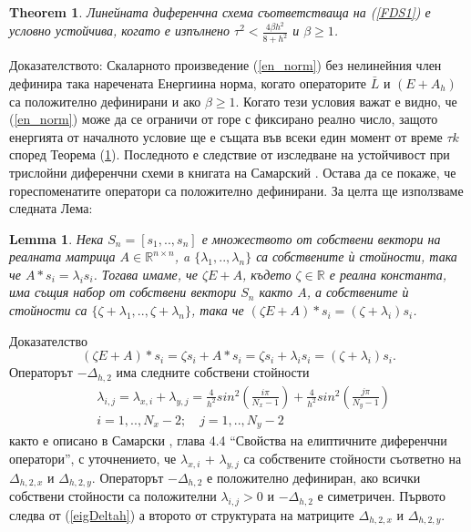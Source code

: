 \documentclass{article}
\newcommand{\be}{\begin{equation}}
\newcommand{\ee}{\end{equation}}
\newcommand{\rf}[1]{(\ref{#1})}
\newcommand{\RR}{\mathbb{R}}
\newtheorem{thm}{Theorem}
\newtheorem{lm}{Lemma}
\begin{document}
\begin{thm}\label{th1}
Линейната диференчна схема съответстваща на \rf{FDS1} е условно устойчива, когато е изпълнено
$\tau^2 < \frac{4 \beta h^2}{8 + h^2}$ и $\beta \ge 1$.
\end{thm}
Доказателството:
Скаларното произведение \rf{en_norm} без нелинейния член дефинира така наречената Енергиина норма, когато операторите $\bar{L}$ и $(E + A_h)$ са положително дефинирани и ако $\beta \ge 1$. Когато тези условия важат е видно, че \rf{en_norm} може да се ограничи от горе с фиксирано реално число, защото енергията от началното условие ще е същата във всеки един момент от време $\tau k$ според Теорема \rf{th1}. Последното е следствие от изследване на устойчивост при трислойни диференчни схеми в книгата на Самарский \cite{samarski}. Остава да се покаже, че гореспоменатите оператори са положително дефинирани. За целта ще използваме следната Лема:

\begin{lm}\label{lemma1}
Нека $S_n=[s_1,..,s_n]$ е множеството от собствени вектори на реалната матрица $A \in \RR^{n\times n}$,
a $\{\lambda_1,..,\lambda_n\}$ са собствените ѝ стойности, така че $A *s_i = \lambda_i s_i$. Тогава имаме, че $\zeta E + A$, където $\zeta \in \RR$ е реална константа, има същия набор от собствени вектори $S_n$ както $A$, а собствените ѝ стойности са $\{\zeta + \lambda_1,..,\zeta + \lambda_n\}$, така че $(\zeta E + A) * s_i = (\zeta+ \lambda_i) s_i$.
\end{lm}
Доказателство
\be
(\zeta E + A) * s_i = \zeta s_i + A * s_i = \zeta s_i + \lambda_i s_i = (\zeta + \lambda_i) s_i.
\ee
Операторът $-\Delta_{h,2}$ има следните собствени стойности
\begin{align}\label{eigDeltah}
&\lambda_{i,j} = \lambda_{x, i} + \lambda_{y,j} = \frac{4}{h^2}sin^2(\frac{i \pi}{N_x-1}) +  \frac{4}{h^2}sin^2(\frac{j \pi}{N_y-1}) \\
&i = 1,..,N_x-2; \quad j = 1, .. , N_y-2 \nonumber
\end{align}
както е описано в Самарски \cite{samarski}, глава 4.4 ``Свойства на елиптичните диференчни оператори'', с уточнението, че $\lambda_{x, i}$ + $\lambda_{y,j}$ са собствените стойности съответно на $\Delta_{h,2,x}$ и $\Delta_{h,2,y}$. Операторът $-\Delta_{h,2}$ е положително дефиниран, ако всички собствени стойности са положителни $\lambda_{i,j}>0$ и $-\Delta_{h,2}$ е симетричен. Първото следва от \rf{eigDeltah} а второто от структурата на матриците $\Delta_{h,2,x}$ и $\Delta_{h,2,y}$.
\end{document}
